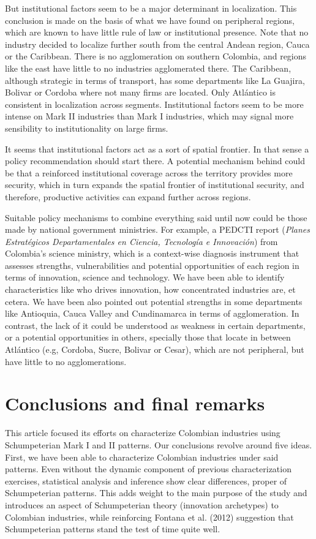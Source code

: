 \documentclass[12pt,a4paper]{article}
\begin{document}
But institutional factors seem to be a major determinant in localization. This conclusion is made on the basis of what we have found on peripheral regions, which are known to have little rule of law or institutional presence. Note that no industry decided to localize further south from the central Andean region, Cauca or the Caribbean. There is no agglomeration on southern Colombia, and regions like the east have little to no industries agglomerated there. The Caribbean, although strategic in terms of transport, has some departments like La Guajira, Bolivar or Cordoba where not many firms are located. Only Atlántico is consistent in localization across segments. Institutional factors seem to be more intense on Mark II industries than Mark I industries, which may signal more sensibility to institutionality on large firms.

It seems that institutional factors act as a sort of spatial frontier. In that sense a policy recommendation should start there. A potential mechanism behind could be that a reinforced institutional coverage across the territory provides more security, which in turn expands the spatial frontier of institutional security, and therefore, productive activities can expand further across regions.

Suitable policy mechanisms to combine everything said until now could be those made by national government ministries. For example, a PEDCTI report (\textit{Planes Estratégicos Departamentales en Ciencia, Tecnología e Innovación}) from Colombia's science ministry, which is a context-wise diagnosis instrument that assesses strengths, vulnerabilities and potential opportunities of each region in terms of innovation, science and technology. We have been able to identify characteristics like who drives innovation, how concentrated industries are, et cetera. We have been also pointed out potential strengths in some departments like Antioquia, Cauca Valley and Cundinamarca in terms of agglomeration. In contrast, the lack of it could be understood as weakness in certain departments, or a potential opportunities in others, specially those that locate in between Atlántico (e.g, Cordoba, Sucre, Bolivar or Cesar), which are not peripheral, but have little to no agglomerations.


\section{Conclusions and final remarks}

This article focused its efforts on characterize Colombian industries using Schumpeterian Mark I and II patterns. Our conclusions revolve around five ideas. First, we have been able to characterize Colombian industries under said patterns. Even without the dynamic component of previous characterization exercises, statistical analysis and inference show clear differences, proper of Schumpeterian patterns. This adds weight to the main purpose of the study and introduces an aspect of Schumpeterian theory (innovation archetypes) to Colombian industries, while reinforcing Fontana et al. (2012) suggestion that Schumpeterian patterns stand the test of time quite well.
\end{document}
